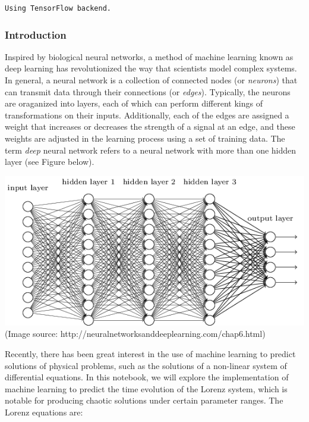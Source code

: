 \documentclass[11pt]{article}
\makeatletter
\def\maxwidth{\ifdim\Gin@nat@width>\linewidth\linewidth
    \else\Gin@nat@width\fi}
\let\Oldincludegraphics\includegraphics
\renewcommand{\includegraphics}[1]{\Oldincludegraphics[width=.8\maxwidth]{#1}}
\makeatother
\begin{document}
    \begin{Verbatim}[commandchars=\\\{\}]
Using TensorFlow backend.

    \end{Verbatim}

    \hypertarget{introduction}{%
\subsubsection{Introduction}\label{introduction}}

    Inspired by biological neural networks, a method of machine learning
known as deep learning has revolutionized the way that scientists model
complex systems. In general, a neural network is a collection of
connected nodes (or \emph{neurons}) that can transmit data through their
connections (or \emph{edges}). Typically, the neurons are oraganized
into layers, each of which can perform different kings of
transformations on their inputs. Additionally, each of the edges are
assigned a weight that increases or decreases the strength of a signal
at an edge, and these weights are adjusted in the learning process using
a set of training data. The term \emph{deep} neural network refers to a
neural network with more than one hidden layer (see Figure below).

\includegraphics{tikz41.png} (Image source:
http://neuralnetworksanddeeplearning.com/chap6.html)

Recently, there has been great interest in the use of machine learning
to predict solutions of physical problems, such as the solutions of a
non-linear system of differential equations. In this notebook, we will
explore the implementation of machine learning to predict the time
evolution of the Lorenz system, which is notable for producing chaotic
solutions under certain parameter ranges. The Lorenz equations are:
\end{document}
